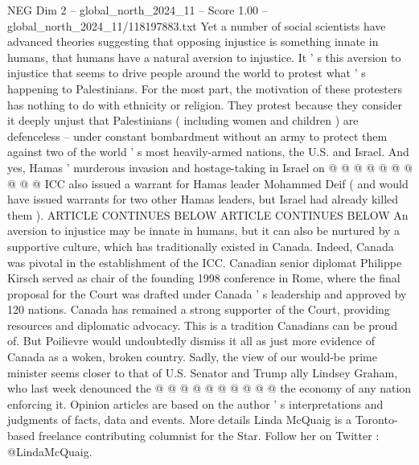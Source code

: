 \begin{textsample}{NEG Dim 2 – global\_north\_2024\_11 – Score 1.00 – global\_north\_2024\_11/118197883.txt}
Yet a number of social scientists have advanced theories suggesting that opposing injustice is something innate in humans, that humans have a natural aversion to injustice.
It ' s this aversion to injustice that seems to drive people around the world to protest what ' s happening to Palestinians.
For the most part, the motivation of these protesters has nothing to do with ethnicity or religion.
They protest because they consider it deeply unjust that Palestinians ( including women and children ) are defenceless -- under constant bombardment without an army to protect them against two of the world ' s most heavily-armed nations, the U.S. and Israel.
And yes, Hamas ' murderous invasion and hostage-taking in Israel on @ @ @ @ @ @ @ @ @ @ ICC also issued a warrant for Hamas leader Mohammed Deif ( and would have issued warrants for two other Hamas leaders, but Israel had already killed them ).
ARTICLE CONTINUES BELOW ARTICLE CONTINUES BELOW An aversion to injustice may be innate in humans, but it can also be nurtured by a supportive culture, which has traditionally existed in Canada.
Indeed, Canada was pivotal in the establishment of the ICC.
Canadian senior diplomat Philippe Kirsch served as chair of the founding 1998 conference in Rome, where the final proposal for the Court was drafted under Canada ' s leadership and approved by 120 nations.
Canada has remained a strong supporter of the Court, providing resources and diplomatic advocacy.
This is a tradition Canadians can be proud of.
But Poilievre would undoubtedly dismiss it all as just more evidence of Canada as a woken, broken country.
Sadly, the view of our would-be prime minister seems closer to that of U.S.
Senator and Trump ally Lindsey Graham, who last week denounced the @ @ @ @ @ @ @ @ @ @ the economy of any nation enforcing it.
Opinion articles are based on the author ' s interpretations and judgments of facts, data and events.
More details Linda McQuaig is a Toronto-based freelance contributing columnist for the Star.
Follow her on Twitter : @LindaMcQuaig.

\end{textsample}
